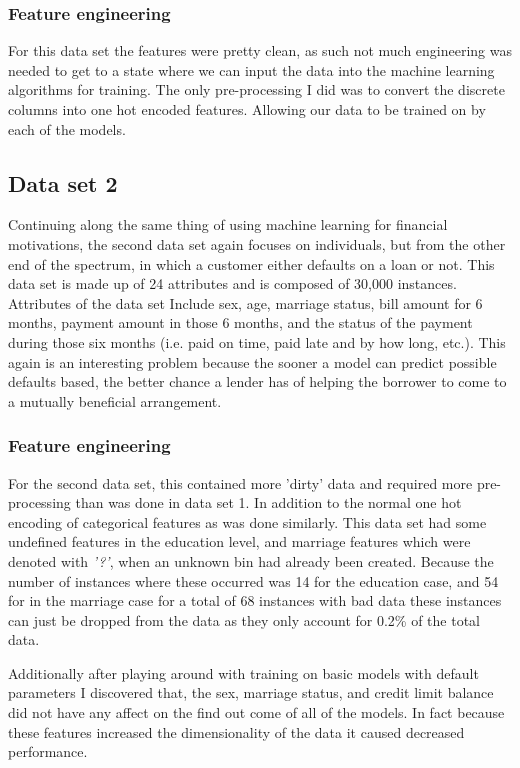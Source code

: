 \documentclass[
	letterpaper, %
]{IEEEtran}
\begin{document}
	\subsubsection{Feature engineering}
	For this data set the features were pretty clean, as such not much engineering was needed to get to a state where we can input the data into the machine learning algorithms for training. The only pre-processing I did was to convert the discrete columns into one hot encoded features. Allowing our data to be trained on by each of the models. 
	
	\subsection{Data set 2}
	Continuing along the same thing of using machine learning for financial motivations, the second data set again focuses on individuals, but from the other end of the spectrum, in which a customer either defaults on a loan or not. This data set is made up of 24 attributes and is composed of 30,000 instances. Attributes of the data set Include sex, age, marriage status, bill amount for 6 months, payment amount in those 6 months, and the status of the payment during those six months (i.e. paid on time, paid late and by how long, etc.). This again is an interesting problem because the sooner a model can predict possible defaults based, the better chance a lender has of helping the borrower to come to a mutually beneficial arrangement.
	
	\subsubsection{Feature engineering}
	For the second data set, this contained more 'dirty' data and required more pre-processing than was done in data set 1. In addition to the normal one hot encoding of categorical features as was done similarly. This data set had some undefined features in the education level, and marriage features which were denoted with \emph{'?'}, when an unknown bin had already been created. Because the number of instances where these occurred was 14 for the education case, and 54 for in the marriage case for a total of 68 instances with bad data these instances can just be dropped from the data as they only account for 0.2\% of the total data.
	
	Additionally after playing around with training on basic models with default parameters I discovered that, the sex, marriage status, and credit limit balance did not have any affect on the find out come of all of the models. In fact because these features increased the dimensionality of the data it caused decreased performance.
	
\end{document}
